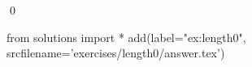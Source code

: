 
\begin{ex} 
  \label{ex:length0}
  
  \qed
\end{ex} 
\begin{python0}
from solutions import *
add(label="ex:length0",
    srcfilename='exercises/length0/answer.tex') 
\end{python0}
